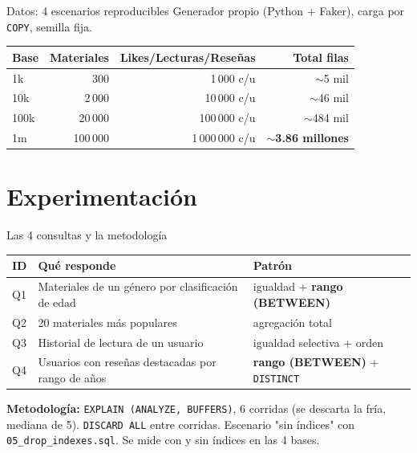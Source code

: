 \documentclass[10pt,aspectratio=169]{beamer}
\begin{document}
\begin{frame}{Datos: 4 escenarios reproducibles}
Generador propio (Python + Faker), carga por \texttt{COPY}, semilla fija.
\vspace{0.3cm}
\centering
\begin{tabular}{lrrr}
\toprule
\textbf{Base} & \textbf{Materiales} & \textbf{Likes/Lecturas/Reseñas} & \textbf{Total filas} \\
\midrule
1k   &     300 &     1\,000 c/u & $\sim$5 mil \\
10k  &   2\,000 &    10\,000 c/u & $\sim$46 mil \\
100k &  20\,000 &   100\,000 c/u & $\sim$484 mil \\
1m   & 100\,000 & 1\,000\,000 c/u & \textbf{$\sim$3.86 millones} \\
\bottomrule
\end{tabular}
\end{frame}

\section{Experimentación}
\begin{frame}{Las 4 consultas y la metodología}
\footnotesize
\begin{tabular}{lll}
\toprule
\textbf{ID} & \textbf{Qué responde} & \textbf{Patrón} \\
\midrule
Q1 & Materiales de un género por clasificación de edad & igualdad + \textbf{rango (BETWEEN)} \\
Q2 & 20 materiales más populares & agregación total \\
Q3 & Historial de lectura de un usuario & igualdad selectiva + orden \\
Q4 & Usuarios con reseñas destacadas por rango de años & \textbf{rango (BETWEEN)} + \texttt{DISTINCT} \\
\bottomrule
\end{tabular}
\vspace{0.3cm}

\textbf{Metodología:} \texttt{EXPLAIN (ANALYZE, BUFFERS)}, 6 corridas (se descarta la fría, mediana de 5). \texttt{DISCARD ALL} entre corridas. Escenario "sin índices" con \texttt{05\_drop\_indexes.sql}. Se mide con y sin índices en las 4 bases.
\end{frame}
\end{document}
